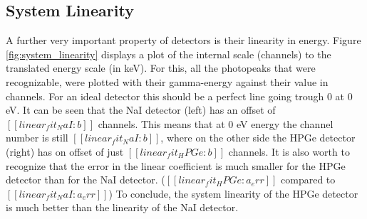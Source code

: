 \documentclass[a4paper]{article}
\begin{document}
\subsection{System Linearity}

A further very important property of detectors is their linearity in energy. Figure \ref{fig:system_linearity} displays a plot of the internal scale (channels) to the translated energy scale (in keV). For this, all the photopeaks that were recognizable, were plotted with their gamma-energy against their value in channels. For an ideal detector this should be a perfect line going trough $0$ at $0$ eV. It can be seen that the NaI detector (left) has an offset of $[[linear_fit_NaI:b]]$ channels. This means that at $0$ eV energy the channel number is still $[[linear_fit_NaI:b]]$, where on the other side the HPGe detector (right) has on offset of just $[[linear_fit_HPGe:b]]$ channels. It is also worth to recognize that the error in the linear coefficient is much smaller for the HPGe detector than for the NaI detector. ($[[linear_fit_HPGe:a_err]]$ compared to $[[linear_fit_NaI:a_err]]$)
\newline
To conclude, the system linearity of the HPGe detector is much better than the linearity of the NaI detector.
\end{document}

